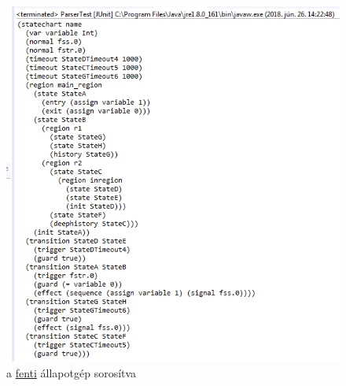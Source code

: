 \begin{figure} [!ht]
\centering
\includegraphics[width=150mm, keepaspectratio]{figures/serializeresult.png}
\caption{\label{fig:serializeresult}a \hyperref[fig:serializeexample]{fenti} állapotgép sorosítva}
\end{figure}

